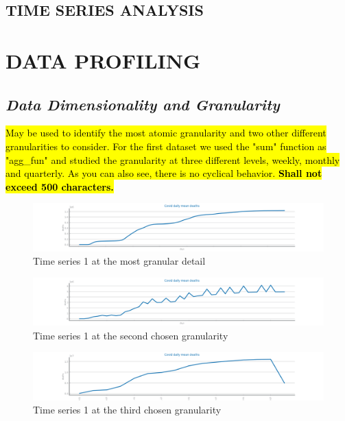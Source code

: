 \documentclass[10pt]{extarticle}
\newcommand{\ctext}[3][RGB]{%
  \begingroup
  \definecolor{hlcolor}{#1}{#2}\sethlcolor{hlcolor}%
  \hl{#3}%
  \endgroup
}
\begin{document}
\begin{center}
	\section*{\fontsize{0.75cm}{1cm}\selectfont TIME SERIES ANALYSIS}
\end{center}

\section{DATA PROFILING}

\subsection*{\textit{Data Dimensionality and Granularity}}
\ctext[RGB]{190,190,190}{May be used to identify the most atomic granularity and two other different granularities to consider.  For the first dataset we used the "sum" function as "agg\_fun" and studied the granularity at three different levels, weekly, monthly and quarterly. As you can also see, there is no cyclical behavior.  \textbf{Shall not exceed 500 characters.}}

\begin{figure}[H]
\centering\includegraphics[scale=0.5]{images/dataset1/time_series/Covid_granularity_aggregation_W.png}
\caption{Time series 1 at the most granular detail}
\end{figure}

\begin{figure}[H]
\centering\includegraphics[scale=0.5]{images/dataset1/time_series/Covid_granularity_aggregation_M.png}
\caption{Time series 1 at the second chosen granularity}
\end{figure}

\begin{figure}[H]
\centering\includegraphics[scale=0.5]{images/dataset1/time_series/Covid_granularity_aggregation_Q.png}
\caption{Time series 1 at the third chosen granularity}
\end{figure}
\end{document}
